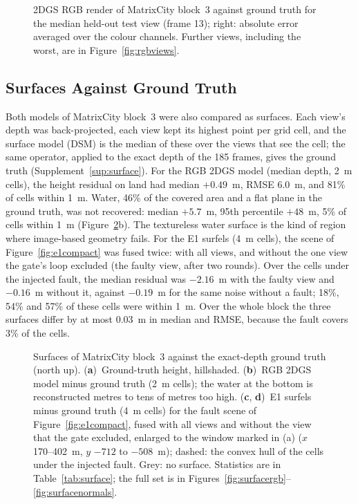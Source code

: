 \begin{figure}[!t]
\centering

\caption{2DGS RGB render of MatrixCity block~3 against ground truth for the median held-out test view
(frame 13); right: absolute error averaged over the colour channels. Further views, including the worst,
are in Figure~\ref{fig:rgbviews}.}
\label{fig:rgbcompact}
\end{figure}
\FloatBarrier

\subsection{Surfaces Against Ground Truth}
\label{sec:results:surface}
Both models of MatrixCity block~3 were also compared as surfaces. Each view's depth was back-projected,
each view kept its highest point per grid cell, and the surface model (DSM) is the median of these over
the views that see the cell; the same operator, applied to the exact depth of the 185 frames, gives the
ground truth (Supplement~\ref{sup:surface}). For the RGB 2DGS model (median depth, 2~m cells), the
height residual on land had median $+0.49$~m, RMSE 6.0~m, and 81\% of cells within 1~m. Water, 46\% of
the covered area and a flat plane in the ground truth, was not recovered: median $+5.7$~m, 95th percentile
$+48$~m, 5\% of cells within 1~m (Figure~\ref{fig:surfacecompact}b). The textureless water surface is the
kind of region where image-based geometry fails. For the E1 surfels (4~m cells), the scene of
Figure~\ref{fig:e1compact} was fused twice: with all views, and without the one view the gate's loop
excluded (the faulty view, after two rounds). Over the cells under the injected fault, the median
residual was $-2.16$~m with the faulty view and $-0.16$~m without it, against $-0.19$~m for the same
noise without a fault; 18\%, 54\% and 57\% of these cells were within 1~m. Over the whole block the three
surfaces differ by at most 0.03~m in median and RMSE, because the fault covers 3\% of the cells.

\begin{figure}[!t]
\centering

\caption{Surfaces of MatrixCity block~3 against the exact-depth ground truth (north up). (\textbf{a})~Ground-truth
height, hillshaded. (\textbf{b})~RGB 2DGS model minus ground truth (2~m cells); the water at the bottom is
reconstructed metres to tens of metres too high. (\textbf{c}, \textbf{d})~E1 surfels minus ground truth (4~m
cells) for the fault scene of Figure~\ref{fig:e1compact}, fused with all views and without the view that the
gate excluded, enlarged to the window marked in (a) ($x$ 170--402~m, $y$ $-712$ to $-508$~m); dashed: the convex
hull of the cells under the injected fault. Grey: no surface. Statistics are in
Table~\ref{tab:surface}; the full set is in Figures~\ref{fig:surfacergb}--\ref{fig:surfacenormals}.}
\label{fig:surfacecompact}
\end{figure}
\FloatBarrier

